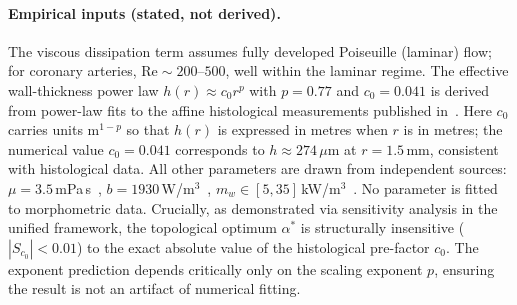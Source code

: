 \documentclass[11pt,a4paper]{article}
\theoremstyle{remark}
\begin{document}
\paragraph{Empirical inputs (stated, not derived).}
The viscous dissipation term assumes fully developed Poiseuille (laminar) flow;
for coronary arteries, $\mathrm{Re}\sim200$--$500$, well within the laminar
regime.
The effective wall-thickness power law $h(r) \approx c_0 r^p$ with $p=0.77$ and 
$c_0=0.041$ is derived from power-law fits to the affine histological measurements 
published in~\cite{Guo2003}. Here $c_0$ carries units $\mathrm{m}^{1-p}$ so that 
$h(r)$ is expressed in metres when $r$ is in metres; the numerical value 
$c_0=0.041$ corresponds to $h\approx274\,\mu\mathrm{m}$ at $r=1.5\,\mathrm{mm}$, 
consistent with histological data.
All other parameters are drawn from independent sources:
$\mu=3.5$\,mPa\,s~\cite{Caro2012},
$b=1930$\,W/$\mathrm{m}^3$~\cite{Murray1926,Taber1998},
$m_w\in[5,35]$\,kW/$\mathrm{m}^3$~\cite{Paul1980}.
No parameter is fitted to morphometric data. Crucially, as demonstrated via
sensitivity analysis in the unified framework, the topological optimum
$\alpha^*$ is structurally insensitive ($|S_{c_0}| < 0.01$) to the exact
absolute value of the histological pre-factor $c_0$. The exponent prediction
depends critically only on the scaling exponent $p$, ensuring the result is not
an artifact of numerical fitting.
\end{document}
